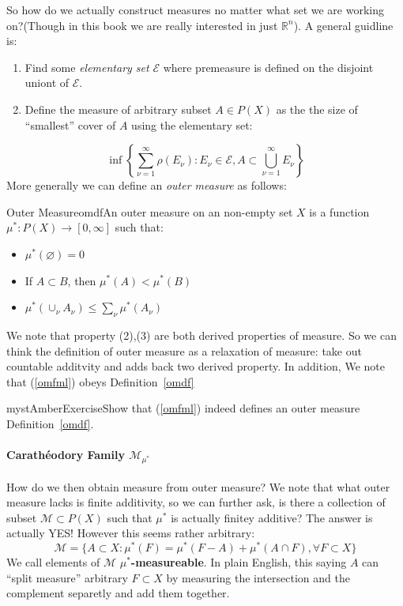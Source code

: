 So how do we actually construct measures no matter what set we are working on?(Though in this book we are really interested in just $\mathbb{R}^n$). A general guidline is:

\begin{enumerate}
\item Find some \textit{elementary set} $\mathcal{E}$ where premeasure is defined on the disjoint uniont of $\mathcal{E}$.
\item Define the measure of arbitrary subset $A\in P(X)$ as the the size of ``smallest'' cover of $A$ using the elementary set:
\end{enumerate}
\begin{equation}
\label{omfml}
\inf \left\{\sum_{\nu=1}^{\infty} \rho(E_{\nu}): E_{\nu}\in \mathcal{E}, A\subset \bigcup_{\nu=1}^{\infty} E_{\nu}\right\}
\end{equation}
More generally we can define an \textit{outer measure} as follows:

\begin{mystthmdefinition}{Outer Measure}{omdf}\label{omdf}An outer measure on an non-empty set $X$ is a function $\mu^* : P(X)\to [0,\infty]$ such that:

\begin{itemize}
\item $\mu^*(\varnothing)=0$
\item If $A\subset B$, then $\mu^*(A)<\mu^*(B)$
\item $\mu^*(\cup_{\nu}A_{\nu})\leq \sum_{\nu} \mu^* (A_{\nu })$
\end{itemize}

\end{mystthmdefinition}
We note that property (2),(3) are both derived properties of measure. So we can think the definition of outer measure as a relaxation of measure: take out countable additvity and adds back two derived property. In addition,  We note that (\ref{omfml}) obeys Definition~\ref{omdf}

\begin{mystadmonition}{mystAmber}{Exercise}Show that (\ref{omfml}) indeed defines an outer measure Definition~\ref{omdf}.

\end{mystadmonition}
\paragraph{Carathéodory Family $\mathcal M_{\mu^*}$}

How do we then obtain measure from outer measure? We note that what outer measure lacks is finite additivity, so we can further ask, is there a collection of subset $\mathcal {M}\subset P(X)$ such that $\mu^*$ is actually finitey additive? The answer is actually YES! However this seems rather arbitrary:
\begin{equation}
\mathcal M = \{A\subset X: \mu^*(F)=\mu^*(F-A)+\mu^*(A\cap F), \forall F \subset X\}
\end{equation}
We call elements of $\mathcal M$ \textbf{$\mu^*$-measureable}. In plain English, this saying $A$ can ``split measure'' arbitrary $F\subset X$ by measuring the intersection and the complement separetly and add them together.

